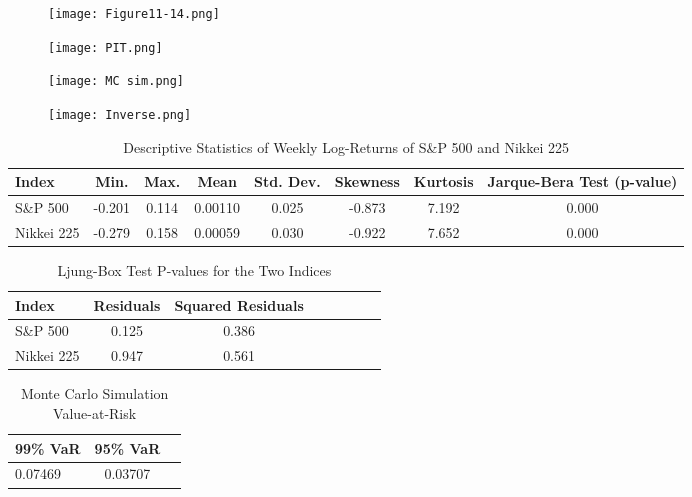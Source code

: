 \documentclass{article}
\begin{document}
\begin{figure}[htb]
    \centering
    \texttt{[image: Figure11-14.png]}
    \label{fig:enter-label}
\end{figure}


\begin{figure}[htb]
    \centering
    \texttt{[image: PIT.png]}
\end{figure}
\begin{figure}[htb]
    \centering
    \texttt{[image: MC sim.png]}
\end{figure}

\begin{figure}[htb]
    \centering
    \texttt{[image: Inverse.png]}
\end{figure}

\clearpage 

\begin{table}[h!]
\centering
    \caption{Descriptive Statistics of Weekly Log-Returns of S\&P 500 and Nikkei 225}
    \begin{tabular}{lccccccc}
        \hline
        Index & Min. & Max. & Mean & Std. Dev. & Skewness & Kurtosis & Jarque-Bera Test (p-value) \\ 
        \hline
        S\&P 500 & -0.201 & 0.114 & 0.00110 & 0.025 & -0.873 & 7.192 & 0.000 \\
        Nikkei 225 & -0.279 & 0.158 & 0.00059 & 0.030 & -0.922 & 7.652 & 0.000 \\
        \hline
    \end{tabular}
    \label{table:descriptive_stats}
\end{table}

\begin{table}[h!]
    \centering
    \caption{Ljung-Box Test P-values for the Two Indices}
    \vspace{0.5cm}
    \begin{tabular}{lccccccc}
        \hline
        Index & Residuals & Squared Residuals \\ 
        \hline
        S\&P 500 & 0.125 & 0.386\\
        Nikkei 225 & 0.947 & 0.561 \\
        \hline
    \end{tabular}
\end{table}

\begin{table}[h!]
    \centering
    \caption{Monte Carlo Simulation Value-at-Risk} 
    \vspace{0.5cm}
    \begin{tabular}{lcc}
        \hline
        99\% VaR	 & 95\% VaR\\ 
        \hline
        0.07469	& 0.03707 \\
        \hline
    \end{tabular}
    \label{table:VaR}
\end{table}
\end{document}
